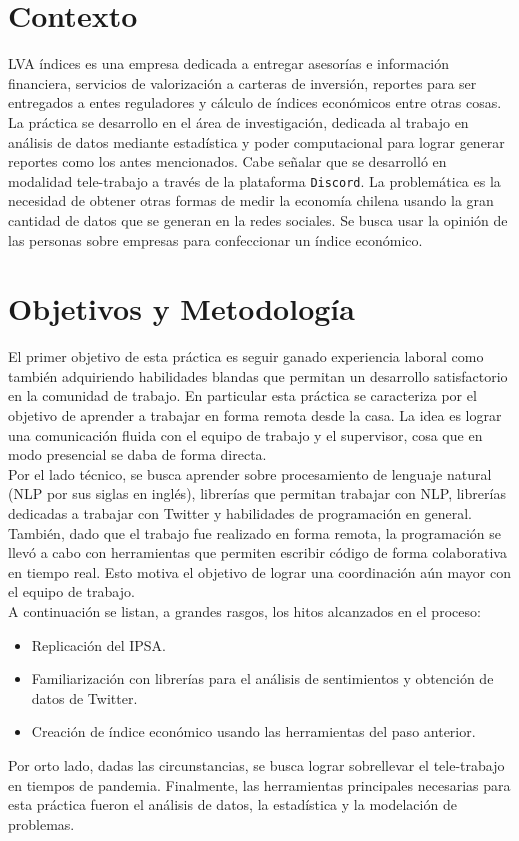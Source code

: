 \documentclass{article}
\begin{document}
\section{Contexto}
	LVA índices es una empresa dedicada a entregar asesorías e información financiera, servicios de valorización a carteras de inversión, reportes para ser entregados a entes reguladores y cálculo de índices económicos entre otras cosas. La práctica se desarrollo en el área de investigación, dedicada al trabajo en análisis de datos mediante estadística y poder computacional para lograr generar reportes como los antes mencionados. Cabe señalar que se desarrolló en modalidad tele-trabajo a través de la plataforma \texttt{Discord}. La problemática es la necesidad de obtener otras formas de medir la economía chilena usando la gran cantidad de datos que se generan en la redes sociales. Se busca usar la opinión de las personas sobre empresas para confeccionar un índice económico.

\section{Objetivos y Metodología}
	El primer objetivo de esta práctica es seguir ganado experiencia laboral como también adquiriendo habilidades blandas que permitan un desarrollo satisfactorio en la comunidad de trabajo. En particular esta práctica se caracteriza por el objetivo de aprender a trabajar en forma remota desde la casa. La idea es lograr una comunicación fluida con el equipo de trabajo y el supervisor, cosa que en modo presencial se daba de forma directa.\\
	\newpage
	Por el lado técnico, se busca aprender sobre procesamiento de lenguaje natural (NLP por sus siglas en inglés), librerías que permitan trabajar con NLP, librerías dedicadas a trabajar con Twitter y habilidades de programación en general. También, dado que el trabajo fue realizado en forma remota, la programación se llevó a cabo con herramientas que permiten escribir código de forma colaborativa en tiempo real. Esto motiva el objetivo de lograr una coordinación aún mayor con el equipo de trabajo.\\
	
	A continuación se listan, a grandes rasgos, los hitos alcanzados en el proceso:
	\begin{itemize}
		\item Replicación del IPSA.
		\item Familiarización con librerías para el análisis de sentimientos y obtención de datos de Twitter.
		\item Creación de índice económico usando las herramientas del paso anterior.
	\end{itemize}
	Por orto lado, dadas las circunstancias, se busca lograr sobrellevar el tele-trabajo en tiempos de pandemia. Finalmente, las herramientas principales necesarias para esta práctica fueron el análisis de datos, la estadística y la modelación de problemas.
\newpage
\end{document}
